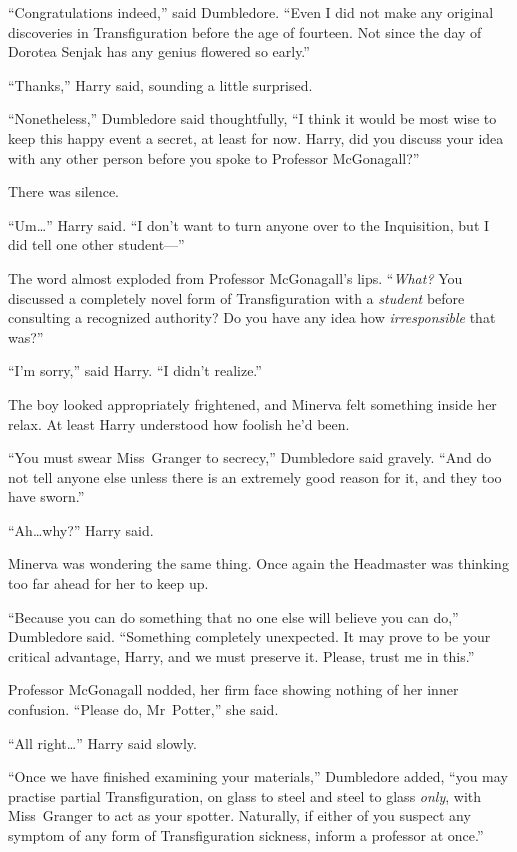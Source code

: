 “Congratulations indeed,” said Dumbledore. “Even I did not make any original discoveries in Transfiguration before the age of fourteen. Not since the day of Dorotea Senjak has any genius flowered so early.”

“Thanks,” Harry said, sounding a little surprised.

“Nonetheless,” Dumbledore said thoughtfully, “I think it would be most wise to keep this happy event a secret, at least for now. Harry, did you discuss your idea with any other person before you spoke to Professor McGonagall?”

There was silence.

“Um…” Harry said. “I don’t want to turn anyone over to the Inquisition, but I did tell one other student—”

The word almost exploded from Professor McGonagall’s lips. “\emph{What?} You discussed a completely novel form of Transfiguration with a \emph{student} before consulting a recognized authority? Do you have any idea how \emph{irresponsible} that was?”

“I’m sorry,” said Harry. “I didn’t realize.”

The boy looked appropriately frightened, and Minerva felt something inside her relax. At least Harry understood how foolish he’d been.

“You must swear Miss~Granger to secrecy,” Dumbledore said gravely. “And do not tell anyone else unless there is an extremely good reason for it, and they too have sworn.”

“Ah…why?” Harry said.

Minerva was wondering the same thing. Once again the Headmaster was thinking too far ahead for her to keep up.

“Because you can do something that no one else will believe you can do,” Dumbledore said. “Something completely unexpected. It may prove to be your critical advantage, Harry, and we must preserve it. Please, trust me in this.”

Professor McGonagall nodded, her firm face showing nothing of her inner confusion. “Please do, Mr~Potter,” she said.

“All right…” Harry said slowly.

“Once we have finished examining your materials,” Dumbledore added, “you may practise partial Transfiguration, on glass to steel and steel to glass \emph{only}, with Miss~Granger to act as your spotter. Naturally, if either of you suspect any symptom of any form of Transfiguration sickness, inform a professor at once.”

